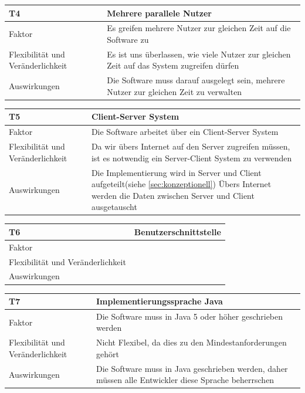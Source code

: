 \documentclass[fontsize=12pt,paper=a4,twoside]{scrartcl}
\begin{document}
\begin{table}[H]
\begin{tabular}{|p{3cm}|p{12cm}|}\hline
T4 & Mehrere parallele Nutzer \\ \hline
Faktor & Es greifen mehrere Nutzer zur gleichen Zeit auf die Software zu\\ \hline
Flexibilität und Veränderlichkeit & Es ist uns überlassen, wie viele Nutzer zur gleichen Zeit auf das System zugreifen dürfen  \\ \hline
Auswirkungen & Die Software muss darauf ausgelegt sein, mehrere Nutzer zur gleichen Zeit zu verwalten\\ \hline
\end{tabular}
\end{table}

\begin{table}[H]
\begin{tabular}{|p{3cm}|p{12cm}|}\hline
T5 & Client-Server System \\ \hline
Faktor & Die Software arbeitet über ein Client-Server System\\ \hline
Flexibilität und Veränderlichkeit & Da wir übers Internet auf den Server zugreifen müssen, ist es notwendig ein Server-Client System zu verwenden \\ \hline
Auswirkungen & Die Implementierung wird in Server und Client aufgeteilt(siehe \ref{sec:konzeptionell}) Übers Internet werden die Daten zwischen Server und Client ausgetauscht\\ \hline
\end{tabular}
\end{table}

\begin{table}[H]
\begin{tabular}{|p{3cm}|p{12cm}|}\hline
T6 & Benutzerschnittstelle \\ \hline
Faktor & \\ \hline
Flexibilität und Veränderlichkeit &  \\ \hline
Auswirkungen & \\ \hline
\end{tabular}
\end{table}

\begin{table}[H]
\begin{tabular}{|p{3cm}|p{12cm}|}\hline
T7 & Implementierungssprache Java \\ \hline
Faktor & Die Software muss in Java 5 oder höher geschrieben werden\\ \hline
Flexibilität und Veränderlichkeit & Nicht Flexibel, da dies zu den Mindestanforderungen gehört\\ \hline
Auswirkungen & Die Software muss in Java geschrieben werden, daher müssen alle Entwickler diese Sprache beherrschen \\ \hline
\end{tabular}
\end{table}
\end{document}
